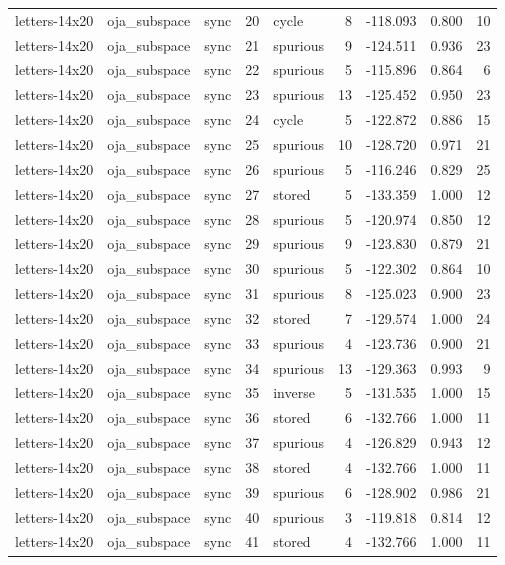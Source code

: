\begin{tabular}{lllrlrrrr}
letters-14x20 & oja\_subspace & sync & 20 & cycle & 8 & -118.093 & 0.800 & 10 \\
letters-14x20 & oja\_subspace & sync & 21 & spurious & 9 & -124.511 & 0.936 & 23 \\
letters-14x20 & oja\_subspace & sync & 22 & spurious & 5 & -115.896 & 0.864 & 6 \\
letters-14x20 & oja\_subspace & sync & 23 & spurious & 13 & -125.452 & 0.950 & 23 \\
letters-14x20 & oja\_subspace & sync & 24 & cycle & 5 & -122.872 & 0.886 & 15 \\
letters-14x20 & oja\_subspace & sync & 25 & spurious & 10 & -128.720 & 0.971 & 21 \\
letters-14x20 & oja\_subspace & sync & 26 & spurious & 5 & -116.246 & 0.829 & 25 \\
letters-14x20 & oja\_subspace & sync & 27 & stored & 5 & -133.359 & 1.000 & 12 \\
letters-14x20 & oja\_subspace & sync & 28 & spurious & 5 & -120.974 & 0.850 & 12 \\
letters-14x20 & oja\_subspace & sync & 29 & spurious & 9 & -123.830 & 0.879 & 21 \\
letters-14x20 & oja\_subspace & sync & 30 & spurious & 5 & -122.302 & 0.864 & 10 \\
letters-14x20 & oja\_subspace & sync & 31 & spurious & 8 & -125.023 & 0.900 & 23 \\
letters-14x20 & oja\_subspace & sync & 32 & stored & 7 & -129.574 & 1.000 & 24 \\
letters-14x20 & oja\_subspace & sync & 33 & spurious & 4 & -123.736 & 0.900 & 21 \\
letters-14x20 & oja\_subspace & sync & 34 & spurious & 13 & -129.363 & 0.993 & 9 \\
letters-14x20 & oja\_subspace & sync & 35 & inverse & 5 & -131.535 & 1.000 & 15 \\
letters-14x20 & oja\_subspace & sync & 36 & stored & 6 & -132.766 & 1.000 & 11 \\
letters-14x20 & oja\_subspace & sync & 37 & spurious & 4 & -126.829 & 0.943 & 12 \\
letters-14x20 & oja\_subspace & sync & 38 & stored & 4 & -132.766 & 1.000 & 11 \\
letters-14x20 & oja\_subspace & sync & 39 & spurious & 6 & -128.902 & 0.986 & 21 \\
letters-14x20 & oja\_subspace & sync & 40 & spurious & 3 & -119.818 & 0.814 & 12 \\
letters-14x20 & oja\_subspace & sync & 41 & stored & 4 & -132.766 & 1.000 & 11 \\

\end{tabular}
